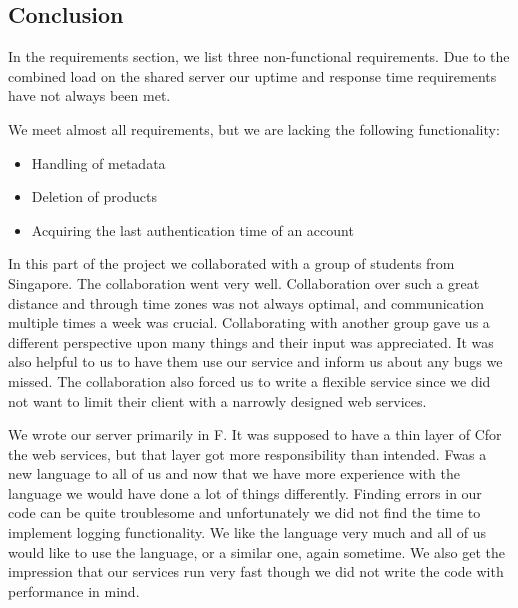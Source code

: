 \subsection{Conclusion}
\label{serverconclusion}
In the requirements section, we list three non-functional requirements. Due to the combined load on the shared server our uptime and response time requirements have not always been met.

We meet almost all requirements, but we are lacking the following functionality:
\begin{itemize}
\item Handling of metadata
\item Deletion of products
\item Acquiring the last authentication time of an account
\end{itemize}

In this part of the project we collaborated with a group of students from Singapore. The collaboration went very well. Collaboration over such a great distance and through time zones was not always optimal, and communication multiple times a week was crucial.
Collaborating with another group gave us a different perspective upon many things and their input was appreciated. It was also helpful to us to have them use our service and inform us about any bugs we missed.
The collaboration also forced us to write a flexible service since we did not want to limit their client with a narrowly designed web services.

We wrote our server primarily in F\Sh. It was supposed to have a thin layer of C\Sh for the web services, but that layer got more responsibility than intended. 
F\Sh was a new language to all of us and now that we have more experience with the language we would have done a lot of things differently. Finding errors in our code can be quite troublesome and unfortunately we did not find the time to implement logging functionality. We like the language very much and all of us would like to use the language, or a similar one, again sometime. We also get the impression that our services run very fast though we did not write the code with performance in mind.
\newpage